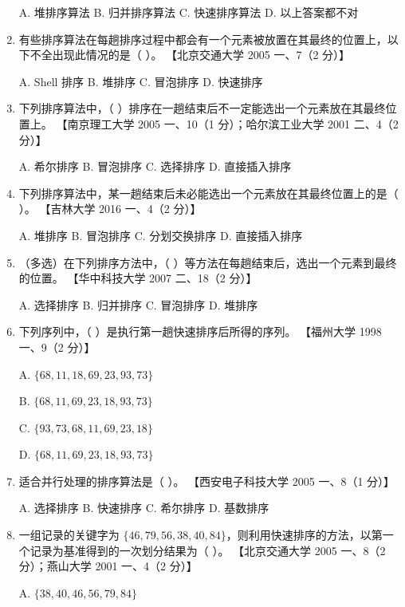 \documentclass[lang=cn,newtx,10pt,scheme=chinese]{elegantbook}
\begin{document}
\begin{enumerate}
    A. 堆排序算法 \quad B. 归并排序算法 \quad C. 快速排序算法 \quad D. 以上答案都不对  

    \item 有些排序算法在每趟排序过程中都会有一个元素被放置在其最终的位置上，以下不全出现此情况的是（ ）。  
    【北京交通大学 2005 一、7（2 分）】  

    A. Shell 排序 \quad B. 堆排序 \quad C. 冒泡排序 \quad D. 快速排序  

    \item 下列排序算法中，（ ）排序在一趟结束后不一定能选出一个元素放在其最终位置上。  
    【南京理工大学 2005 一、10（1 分）；哈尔滨工业大学 2001 二、4（2 分）】  

    A. 希尔排序 \quad B. 冒泡排序 \quad C. 选择排序 \quad D. 直接插入排序  

    \item 下列排序算法中，某一趟结束后未必能选出一个元素放在其最终位置上的是（ ）。  
    【吉林大学 2016 一、4（2 分）】 

    A. 堆排序 \quad B. 冒泡排序 \quad C. 分划交换排序 \quad D. 直接插入排序  

    \item （多选）在下列排序方法中，（ ）等方法在每趟结束后，选出一个元素到最终的位置。  
    【华中科技大学 2007 二、18（2 分）】  

    A. 选择排序 \quad B. 归并排序 \quad C. 冒泡排序 \quad D. 堆排序  

    \item 下列序列中，（ ）是执行第一趟快速排序后所得的序列。  
    【福州大学 1998 一、9（2 分）】 

    A. $\{68, 11, 18, 69, 23, 93, 73\}$  

    B. $\{68, 11, 69, 23, 18, 93, 73\}$ 

    C. $\{93, 73, 68, 11, 69, 23, 18\}$  

    D. $\{68, 11, 69, 23, 18, 93, 73\}$  

    \item 适合并行处理的排序算法是（ ）。  
    【西安电子科技大学 2005 一、8（1 分）】  

    A. 选择排序 \quad B. 快速排序 \quad C. 希尔排序 \quad D. 基数排序  

    \item 一组记录的关键字为 $\{46, 79, 56, 38, 40, 84\}$，则利用快速排序的方法，以第一个记录为基准得到的一次划分结果为（ ）。  
    【北京交通大学 2005 一、8（2 分）；燕山大学 2001 一、4（2 分）】  

    A. $\{38, 40, 46, 56, 79, 84\}$  


\end{enumerate}
\end{document}
